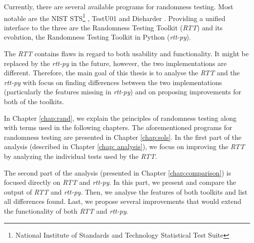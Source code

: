 \documentclass[
  digital,     %
  oneside,     %
  nosansbold,  %
  nocolorbold, %
  nolof,         %
  nolot,         %
]{fithesis4}
\begin{document}

Currently, there are several available programs for randomness testing. Most notable are the NIST STS\footnote{National Institute of Standards and Technology Statistical Test Suite} \cite{nist_site}, TestU01 \cite{tu01_site} and Dieharder \cite{dieharder_orig}. Providing a unified interface to the three are the Randomness Testing Toolkit (\emph{RTT}) \cite{rtt-site} and its evolution, the Randomness Testing Toolkit in Python (\emph{rtt-py})\cite{rtt-py-site}.




The \emph{RTT} contains flaws in regard to both usability and functionality. It might be replaced by the \emph{rtt-py} in the future, however, the two implementations are different. Therefore, the main goal of this thesis is to analyse the \emph{RTT} and the \emph{rtt-py} with focus on finding differences between the two implementations (particularly the features missing in \emph{rtt-py}) and on proposing improvements for both of the toolkits. 

In Chapter \ref{chap:rand}, we explain the principles of randomness testing along with terms used in the following chapters. The aforementioned programs for randomness testing are presented in Chapter \ref{chap:sols}. In the first part of the analysis (described in Chapter \ref{chap: analysis}), we focus on improving the \emph{RTT} by analyzing the individual tests used by the \emph{RTT}. %

The second part of the analysis (presented in Chapter \ref{chap:comparison}) is focused directly on \emph{RTT} and \emph{rtt-py}. In this part, we present and compare the output of \emph{RTT} and \emph{rtt-py}. Then, we analyse the features of both toolkits and list all differences found. Last, we propose several improvements that would extend the functionality of both \emph{RTT} and \emph{rtt-py}.
\end{document}
